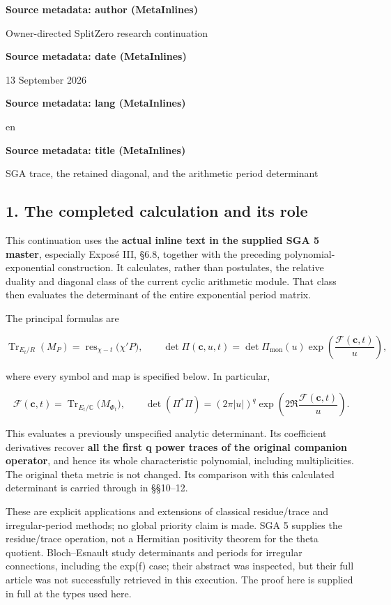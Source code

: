 \textbf{Source metadata: author (MetaInlines)}

Owner-directed SplitZero research continuation

\textbf{Source metadata: date (MetaInlines)}

13 September 2026

\textbf{Source metadata: lang (MetaInlines)}

en

\textbf{Source metadata: title (MetaInlines)}

SGA trace, the retained diagonal, and the arithmetic period determinant

\subsection{1. The completed calculation and its role}\label{endpoint-sga_trace_period--the-completed-calculation-and-its-role}

This continuation uses the \textbf{actual inline text in the supplied SGA 5 master}, especially Exposé III, §6.8, together with the preceding polynomial-exponential construction. It calculates, rather than postulates, the relative duality and diagonal class of the current cyclic arithmetic module. That class then evaluates the determinant of the entire exponential period matrix.

The principal formulas are

\[
\operatorname{Tr}_{E_t/R}(M_P)
 =\operatorname{res}_{\chi-t}\bigl(\chi'P\bigr),
\qquad
\det\Pi(\mathbf c,u,t)
 =\det\Pi_{\mathrm{mon}}(u)\exp\!\left(\frac{\mathcal F(\mathbf c,t)}u\right),
\tag{1}
\]

where every symbol and map is specified below. In particular,

\[
\mathcal F(\mathbf c,t)
 =\operatorname{Tr}_{E_t/\mathbb C}\bigl(M_{\Phi_t}\bigr),
\qquad
\det(\Pi^*\Pi)
 =(2\pi|u|)^q\exp\!\left(2\Re\frac{\mathcal F(\mathbf c,t)}u\right).
\tag{2}
\]

This evaluates a previously unspecified analytic determinant. Its coefficient derivatives recover \textbf{all the first q power traces of the original companion operator}, and hence its whole characteristic polynomial, including multiplicities. The original theta metric is not changed. Its comparison with this calculated determinant is carried through in §§10--12.

These are explicit applications and extensions of classical residue/trace and irregular-period methods; no global priority claim is made. SGA 5 supplies the residue/trace operation, not a Hermitian positivity theorem for the theta quotient. Bloch--Esnault study determinants and periods for irregular connections, including the exp(f) case; their abstract was inspected, but their full article was not successfully retrieved in this execution. The proof here is supplied in full at the types used here.

